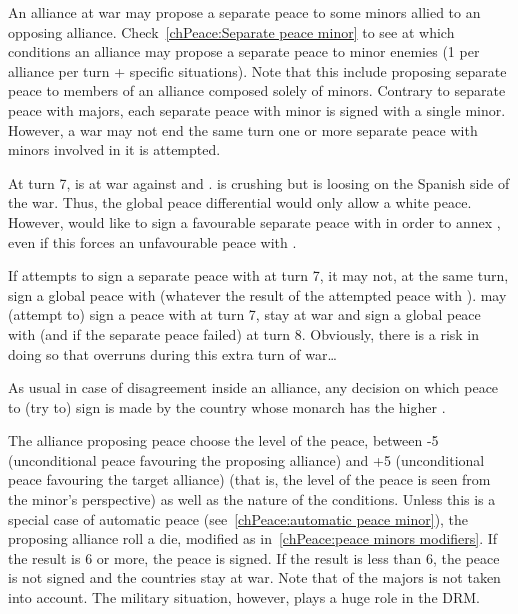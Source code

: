  An alliance at war may propose a separate peace to
some minors allied to an opposing alliance.
\bparag Check~\ref{chPeace:Separate peace minor} to see at which conditions an
alliance may propose a separate peace to minor enemies (1 per alliance per
turn + specific situations).
\bparag Note that this include proposing separate peace to members of an
alliance composed solely of minors.
\bparag Contrary to separate peace with majors, each separate peace with minor
is signed with a single minor. However, a war may not end the same turn one or
more separate peace with minors involved in it is attempted.

\begin{exemple}
  At turn 7, \FRA is at war against \HIS and \paysSavoie. \FRA is crushing
  \paysSavoie but is loosing on the Spanish side of the war. Thus, the global
  peace differential would only allow a white peace. However, \FRA would like
  to sign a favourable separate peace with \paysSavoie in order to annex
  \provinceBresse, even if this forces an unfavourable peace with \HIS.

  If \FRA attempts to sign a separate peace with \paysSavoie at turn 7, it may
  not, at the same turn, sign a global peace with \HIS (whatever the result of
  the attempted peace with \paysSavoie). \FRA may (attempt to) sign a peace
  with \paysSavoie at turn 7, stay at war and sign a global peace with \HIS
  (and \paysSavoie if the separate peace failed) at turn 8. Obviously, there
  is a risk in doing so that \HIS overruns \FRA during this extra turn of
  war\ldots
\end{exemple}

\aparag[Disagreement] As usual in case of disagreement inside an alliance, any
decision on which peace to (try to) sign is made by the country whose monarch
has the higher \DIP.

\aparag[Method]
\bparag The alliance proposing peace choose the level of the peace, between -5
(unconditional peace favouring the proposing alliance) and +5 (unconditional
peace favouring the target alliance) (that is, the level of the peace is seen
from the minor's perspective) as well as the nature of the conditions.
\bparag Unless this is a special case of automatic peace
(see~\ref{chPeace:automatic peace minor}), the proposing alliance roll a die,
modified as in~\ref{chPeace:peace minors modifiers}.
\bparag If the result is 6 or more, the peace is signed.
\bparag If the result is less than 6, the peace is not signed and the
countries stay at war.
\bparag Note that \STAB of the majors is not taken into account. The military
situation, however, plays a huge role in the DRM.


